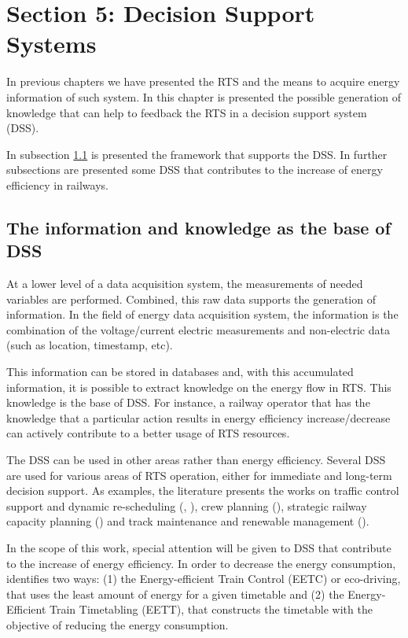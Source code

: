 


\section{Section 5: Decision Support Systems}
In previous chapters we have presented the RTS and the means to acquire energy information of such system.
In this chapter is presented the possible generation of knowledge that can help to feedback the RTS in a decision support system (DSS).

In subsection \ref{subs:351} is presented the framework that supports the DSS. In further subsections are presented some DSS that contributes to the increase of energy efficiency in railways.


\subsection{The information and knowledge as the base of DSS}
\label{subs:351}

	At a lower level of a data acquisition system, the measurements of needed variables are performed. 
	Combined, this raw data supports the generation of information.
	In the field of energy data acquisition system, the information is the combination of the voltage/current electric measurements and non-electric data (such as location, timestamp, etc).
	
	This information can be stored in databases and, with this accumulated information, it is possible to extract knowledge on the energy flow in RTS.
	This knowledge is the base of DSS. For instance, a railway operator that has the knowledge that a particular action results in energy efficiency increase/decrease can actively contribute to a better usage of RTS resources.
	
	The DSS can be used in other areas rather than energy efficiency. 	
	Several DSS are used for various areas of RTS operation, either for immediate and long-term decision support.
	As examples, the literature presents the works on traffic control support and dynamic re-scheduling (\cite{dariano2009}, \cite{krasemann2012}), crew planning (\cite{freling2004}), strategic railway capacity planning (\cite{lai2011}) and track maintenance and renewable management (\cite{guler2013}).
	
	
	In the scope of this work, special attention will be given to DSS that contribute to the increase of energy efficiency. In order to decrease the energy consumption, \cite{scheepmaker2017} identifies two ways: (1) the Energy-efficient Train Control (EETC) or eco-driving, that uses the least amount of energy for a given timetable and (2) the Energy-Efficient Train Timetabling (EETT), that constructs the timetable with the objective of reducing the energy consumption.
	
